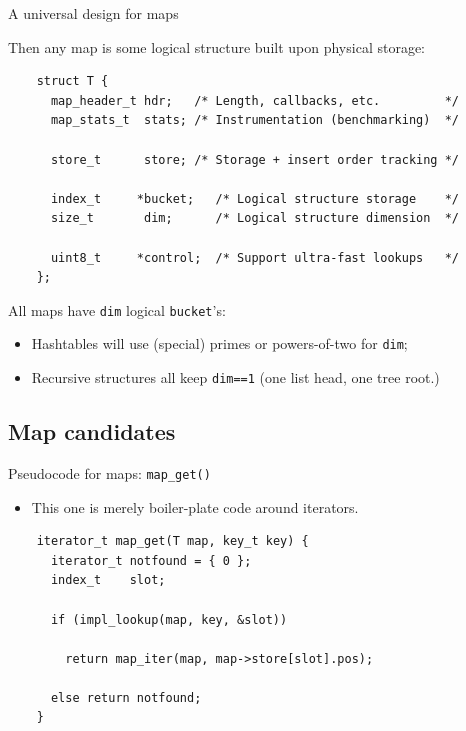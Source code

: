 \begin{frame}[fragile]{A universal design for maps}

  Then any map is some logical structure built upon physical storage:
  \begin{lstlisting}
    struct T {
      map_header_t hdr;   /* Length, callbacks, etc.         */
      map_stats_t  stats; /* Instrumentation (benchmarking)  */

      store_t      store; /* Storage + insert order tracking */

      index_t     *bucket;   /* Logical structure storage    */
      size_t       dim;      /* Logical structure dimension  */

      uint8_t     *control;  /* Support ultra-fast lookups   */
    };
  \end{lstlisting}

  All maps have \lstinline{dim} logical \lstinline{bucket}'s:
  \begin{itemize}
  \item Hashtables will use (special) primes or powers-of-two for \lstinline{dim};
  \item Recursive structures all keep \lstinline{dim==1} (one list head, one tree root.)
  \end{itemize}
  
\end{frame}


\subsection{Map candidates}

\begin{frame}[fragile]{Pseudocode for maps: \lstinline{map_get()}}

  \begin{itemize}
  \item This one is merely boiler-plate code around iterators.
  \end{itemize}

  \begin{lstlisting}
    iterator_t map_get(T map, key_t key) {
      iterator_t notfound = { 0 };
      index_t    slot;
      
      if (impl_lookup(map, key, &slot))
      
        return map_iter(map, map->store[slot].pos);
      
      else return notfound;
    }
  \end{lstlisting}

\end{frame}


